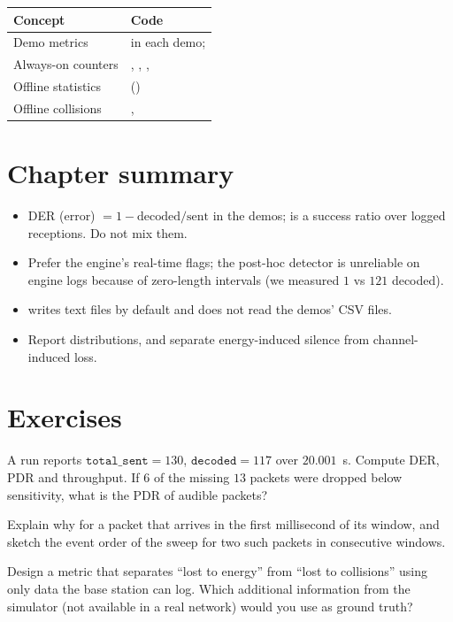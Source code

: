 \begin{codemap}
\small
\begin{tabularx}{\linewidth}{@{}>{\ttfamily}p{5.0cm}X@{}}
\toprule
\normalfont\bfseries Concept & \normalfont\bfseries Code\\
\midrule
Demo metrics & \codew{run_simulation()} in each demo; \codew{save_packets}\\
Always-on counters & \codew{BSBehavior.total_rx}, \codew{total_collided}, \code{total_tx}, \codew{rx_count_by_node}\\
Offline statistics & \codew{analyze_packets} (\file{packet_analysis.py})\\
Offline collisions & \codew{detect_collisions}, \codew{_analyze_collision_outcome}\\
\bottomrule
\end{tabularx}
\end{codemap}

\section{Chapter summary}
\begin{itemize}
 \item DER (error) $=1-\text{decoded}/\text{sent}$ in the demos;  is a success ratio over logged receptions. Do not mix them.
 \item Prefer the engine's real-time  flags; the post-hoc detector is unreliable on engine logs because of zero-length intervals (we measured $1$ vs $121$ decoded).
 \item {} writes text files by default and does not read the demos' CSV files.
 \item Report distributions, and separate energy-induced silence from channel-induced loss.
\end{itemize}

\section*{Exercises}
\begin{exercise}
A run reports $\texttt{total\_sent}=130$, $\texttt{decoded}=117$ over $20.001$~s. Compute DER, PDR and throughput. If $6$ of the missing $13$ packets were dropped below sensitivity, what is the PDR of audible packets?
\end{exercise}
\begin{exercise}
Explain why  for a packet that arrives in the first millisecond of its window, and sketch the event order of the sweep for two such packets in consecutive windows.
\end{exercise}
\begin{exercise}
Design a metric that separates ``lost to energy'' from ``lost to collisions'' using only data the base station can log. Which additional information from the simulator (not available in a real network) would you use as ground truth?
\end{exercise}
